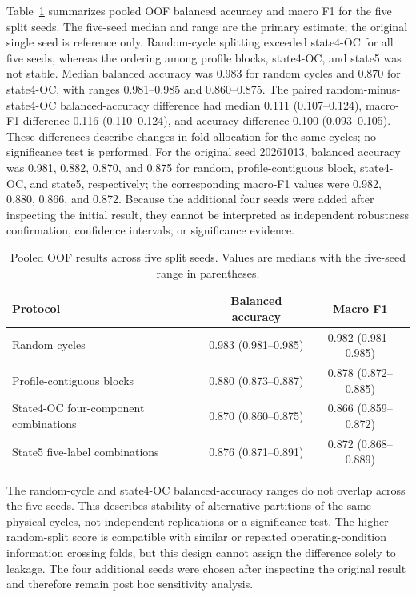 \documentclass[11pt,a4paper]{article}
\newcommand{\toprule}{\hline}
\newcommand{\midrule}{\hline}
\newcommand{\bottomrule}{\hline}
\begin{document}
Table~\ref{tab:main} summarizes pooled OOF balanced accuracy and macro F1 for the five split seeds. The five-seed median and range are the primary estimate; the original single seed is reference only. Random-cycle splitting exceeded state4-OC for all five seeds, whereas the ordering among profile blocks, state4-OC, and state5 was not stable. Median balanced accuracy was 0.983 for random cycles and 0.870 for state4-OC, with ranges 0.981--0.985 and 0.860--0.875. The paired random-minus-state4-OC balanced-accuracy difference had median 0.111 (0.107--0.124), macro-F1 difference 0.116 (0.110--0.124), and accuracy difference 0.100 (0.093--0.105). These differences describe changes in fold allocation for the same cycles; no significance test is performed. For the original seed 20261013, balanced accuracy was 0.981, 0.882, 0.870, and 0.875 for random, profile-contiguous block, state4-OC, and state5, respectively; the corresponding macro-F1 values were 0.982, 0.880, 0.866, and 0.872. Because the additional four seeds were added after inspecting the initial result, they cannot be interpreted as independent robustness confirmation, confidence intervals, or significance evidence.

\begin{table}[htbp]
\centering\small
\caption{Pooled OOF results across five split seeds. Values are medians with the five-seed range in parentheses.}
\label{tab:main}
\begin{tabular}{lcc}
\toprule
Protocol & Balanced accuracy & Macro F1\\
\midrule
Random cycles & 0.983 (0.981--0.985) & 0.982 (0.981--0.985)\\
Profile-contiguous blocks & 0.880 (0.873--0.887) & 0.878 (0.872--0.885)\\
State4-OC four-component combinations & 0.870 (0.860--0.875) & 0.866 (0.859--0.872)\\
State5 five-label combinations & 0.876 (0.871--0.891) & 0.872 (0.868--0.889)\\
\bottomrule
\end{tabular}
\end{table}

The random-cycle and state4-OC balanced-accuracy ranges do not overlap across the five seeds. This describes stability of alternative partitions of the same physical cycles, not independent replications or a significance test. The higher random-split score is compatible with similar or repeated operating-condition information crossing folds, but this design cannot assign the difference solely to leakage. The four additional seeds were chosen after inspecting the original result and therefore remain post hoc sensitivity analysis.
\end{document}
